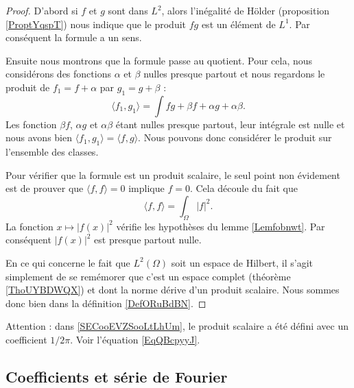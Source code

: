 \begin{proof}
    D'abord si \( f\) et \( g\) sont dans \( L^2\), alors l'inégalité de Hölder (proposition \ref{ProptYqspT}) nous indique que le produit \( fg\) est un élément de \( L^1\). Par conséquent la formule a un sens.

    Ensuite nous montrons que la formule passe au quotient. Pour cela, nous considérons des fonctions \( \alpha\) et \( \beta\) nulles presque partout et nous regardons le produit de \( f_1=f+\alpha\) par \( g_1=g+\beta\) :
    \begin{equation}
        \langle f_1, g_1\rangle =\int fg+\beta f+\alpha g+ \alpha\beta.
    \end{equation}
    Les fonction \( \beta f\), \( \alpha g\) et \( \alpha\beta\) étant nulles presque partout, leur intégrale est nulle et nous avons bien \( \langle f_1, g_1\rangle =\langle f,g \rangle \). Nous pouvons donc considérer le produit sur l'ensemble des classes.

    Pour vérifier que la formule est un produit scalaire, le seul point non évidement est de prouver que \( \langle f, f\rangle =0\) implique \( f=0\). Cela découle du fait que
    \begin{equation}
        \langle f, f\rangle =\int_{\Omega}| f |^2.
    \end{equation}
    La fonction \( x\mapsto | f(x) |^2\) vérifie les hypothèses du lemme \ref{Lemfobnwt}. Par conséquent \( | f(x) |^2\) est presque partout nulle.

    En ce qui concerne le fait que \( L^2(\Omega)\) soit un espace de Hilbert, il s'agit simplement de se remémorer que c'est un espace complet (théorème  \ref{ThoUYBDWQX}) et dont la norme dérive d'un produit scalaire. Nous sommes donc bien dans la définition \ref{DefORuBdBN}.
\end{proof}

Attention : dans \ref{SECooEVZSooLtLhUm}, le produit scalaire a été défini
avec un coefficient \( 1/2\pi\). Voir l'équation \eqref{EqQBcpyyJ}.

\subsection{Coefficients et série de Fourier}
\label{subSecXAYasNI}

